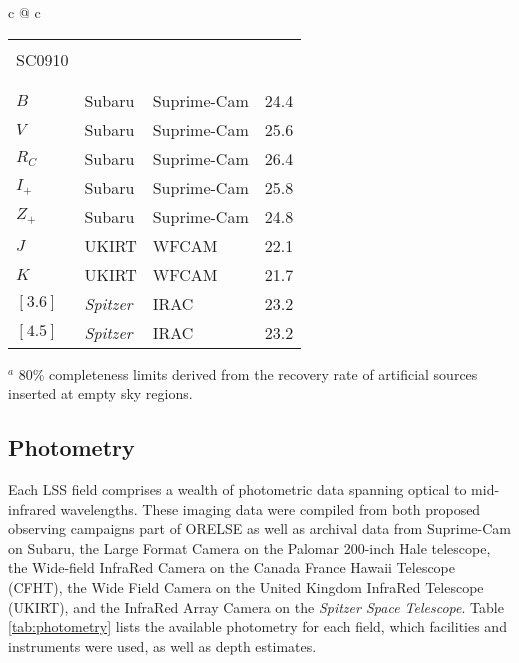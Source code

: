 \documentclass[a4paper,fleqn,usenatbib]{mnras}
\begin{document}
\begin{table*}
\begin{center}
\begin{tabular}{c @{\hskip 15mm} c}
\begin{tabular}{llll}
		\hline \\[-3mm]
		SC0910 \\[-1mm]
		\hline \\[-5mm]  
		\hline \\[-2mm]

		$B$    &   Subaru   &   Suprime-Cam   &   24.4   \\
		$V$    &   Subaru   &   Suprime-Cam   &   25.6   \\
		$R_C$  &   Subaru   &   Suprime-Cam   &   26.4   \\
		$I_+$  &   Subaru   &   Suprime-Cam   &   25.8   \\
		$Z_+$  &   Subaru   &   Suprime-Cam   &   24.8   \\
		$J$   &   UKIRT   &   WFCAM   &   22.1   \\
		$K$   &   UKIRT   &   WFCAM   &   21.7   \\
		$[3.6]$  &   {\it Spitzer}  &   IRAC   &   23.2   \\
		$[4.5]$  &   {\it Spitzer}  &   IRAC   &   23.2   \\[1mm]

		\end{tabular}

	\end{tabular}

	\end{center}

	$^a$ 80\% completeness limits derived from the recovery rate of artificial sources inserted at empty sky regions.

\end{table*}



\subsection{Photometry}

Each LSS field comprises a wealth of photometric data spanning optical to mid-infrared wavelengths.
These imaging data were compiled from both proposed observing campaigns part of ORELSE as well as archival data from Suprime-Cam \citep{Miyazaki2002} on Subaru, the Large Format Camera \citep[LFC:][]{Simcoe2000} on the Palomar 200-inch Hale telescope, the Wide-field InfraRed Camera \citep[WIRCam:][]{Puget2004} on the Canada France Hawaii Telescope (CFHT), the Wide Field Camera \citep[WFCAM:][]{Casali2007} on the United Kingdom InfraRed Telescope (UKIRT), and the InfraRed Array Camera \citep[IRAC:][]{Fazio2004} on the {\it Spitzer Space Telescope}.
Table \ref{tab:photometry} lists the available photometry for each field, which facilities and instruments were used, as well as depth estimates.
\end{document}
